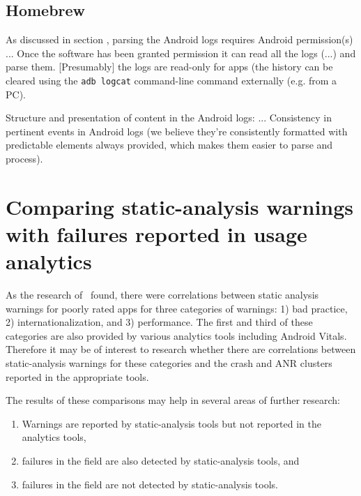 \subsection{Homebrew}
As discussed in section \href{platform-level-analytics}{\emph{}}, parsing the Android logs requires Android permission(s) ... Once the software has been granted permission it can read all the logs (...) and parse them. [Presumably] the logs are read-only for apps (the history can be cleared using the \texttt{adb logcat} command-line command externally (e.g. from a PC).

Structure and presentation of content in the Android logs: ...
Consistency in pertinent events in Android logs (we believe they're consistently formatted with predictable elements always provided, which makes them easier to parse and process).

\section{Comparing static-analysis warnings with failures reported in usage analytics}
As the research of~\cite{khalid2016_examining_the_relationship_between_findbugs_warnings_and_app_ratings} found, there were correlations between static analysis warnings for poorly rated apps for three categories of warnings: 1) bad practice, 2) internationalization, and 3) performance. The first and third of these categories are also provided by various analytics tools including Android Vitals. Therefore it may be of interest to research whether there are correlations between static-analysis warnings for these categories and the crash and ANR clusters reported in the appropriate tools. 

The results of these comparisons may help in several areas of further research:
\begin{enumerate}
    \item Warnings are reported by static-analysis tools but not reported in the analytics tools,
    \item failures in the field are also detected by static-analysis tools, and
    \item failures in the field are not detected by static-analysis tools.
\end{enumerate}

